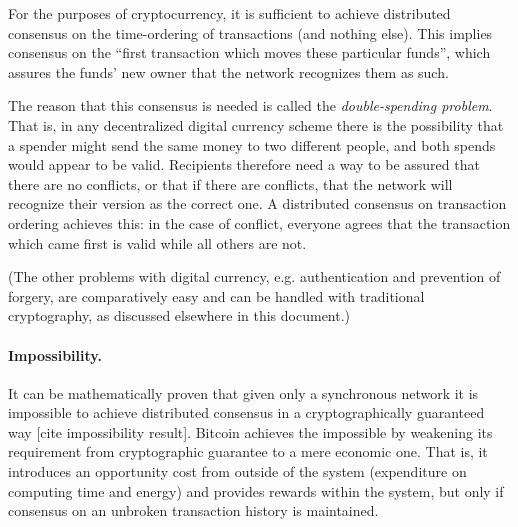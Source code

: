 \documentclass[letterpaper]{article}
\begin{document}
For the purposes of cryptocurrency, it is sufficient to achieve distributed consensus
on the time-ordering of transactions (and nothing else). This implies consensus on
the ``first transaction which moves these particular funds'', which assures the funds'
new owner that the network recognizes them as such.

The reason that this consensus is needed is called the \emph{double-spending problem}.
That is, in any decentralized digital currency scheme there is the possibility that
a spender might send the same money to two different people, and both spends would
appear to be valid. Recipients therefore need a way to be assured that there are no
conflicts, or that if there are conflicts, that the network will recognize their
version as the correct one. A distributed consensus on transaction ordering achieves
this: in the case of conflict, everyone agrees that the transaction which came first
is valid while all others are not.

(The other problems with digital currency, e.g. authentication and prevention of
forgery, are comparatively easy and can be handled with traditional cryptography,
as discussed elsewhere in this document.)

\paragraph{Impossibility.}
It can be mathematically proven that given only a synchronous network it is
impossible to achieve distributed
consensus in a cryptographically guaranteed way [cite impossibility result]. Bitcoin
achieves the impossible by weakening its requirement from cryptographic guarantee
to a mere economic one. That is, it introduces an opportunity cost from outside of
the system (expenditure on computing time and energy) and provides rewards within
the system, but only if consensus on an unbroken transaction history is maintained.
\end{document}
